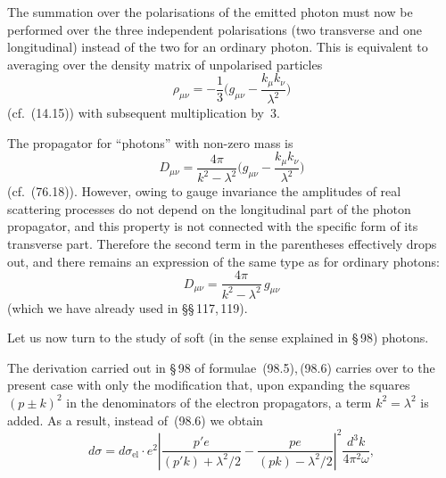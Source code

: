 The summation over the polarisations of the emitted photon must now be performed over the three independent polarisations (two transverse and one longitudinal) instead of the two for an ordinary photon. This is equivalent to averaging over the density matrix of unpolarised particles
\begin{equation}
\rho_{\mu\nu} = -\frac{1}{3}\biggl(g_{\mu\nu} - \frac{k_\mu k_\nu}{\lambda^2}\biggr)
\label{eq:120.4}
\end{equation}
(cf.~(14.15)) with subsequent multiplication by~3.

The propagator for ``photons'' with non-zero mass is
\[
D_{\mu\nu} = \frac{4\pi}{k^2 - \lambda^2}\biggl(g_{\mu\nu} - \frac{k_\mu k_\nu}{\lambda^2}\biggr)
\]
(cf.~(76.18)). However, owing to gauge invariance the amplitudes of real scattering processes do not depend on the longitudinal part of the photon propagator, and this property is not connected with the specific form of its transverse part. Therefore the second term in the parentheses effectively drops out, and there remains an expression of the same type as for ordinary photons:
\begin{equation}
D_{\mu\nu} = \frac{4\pi}{k^2 - \lambda^2}\,g_{\mu\nu}
\label{eq:120.5}
\end{equation}
(which we have already used in \S\S\,117,\,119).

Let us now turn to the study of soft (in the sense explained in \S\,98) photons.

The derivation carried out in \S\,98 of formulae~(98.5),\,(98.6) carries over to the present case with only the modification that, upon expanding the squares $(p \pm k)^2$ in the denominators of the electron propagators, a term $k^2 = \lambda^2$ is added. As a result, instead of~(98.6) we obtain
\begin{equation}
d\sigma = d\sigma_{\text{el}} \cdot e^2 \left|\frac{p'e}{(p'k) + \lambda^2/2} - \frac{pe}{(pk) - \lambda^2/2}\right|^2 \frac{d^3 k}{4\pi^2 \omega},
\label{eq:120.6}
\end{equation}


